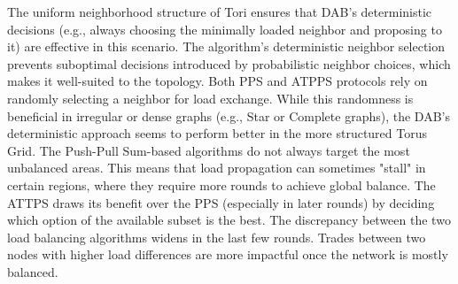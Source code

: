 The uniform neighborhood structure of Tori ensures that DAB's deterministic decisions (e.g., always choosing the minimally loaded neighbor and proposing to it) are effective in this scenario. The algorithm's deterministic neighbor selection prevents suboptimal decisions introduced by probabilistic neighbor choices, which makes it well-suited to the topology. Both PPS and ATPPS protocols rely on randomly selecting a neighbor for load exchange. While this randomness is beneficial in irregular or dense graphs (e.g., Star or Complete graphs), the DAB's deterministic approach seems to perform better in the more structured Torus Grid. The Push-Pull Sum-based algorithms do not always target the most unbalanced areas. This means that load propagation can sometimes "stall" in certain regions, where they require more rounds to achieve global balance. The ATTPS draws its benefit over the PPS (especially in later rounds) by deciding which option of the available subset is the best. The discrepancy between the two load balancing algorithms widens in the last few rounds. Trades between two nodes with higher load differences are more impactful once the network is mostly balanced.

